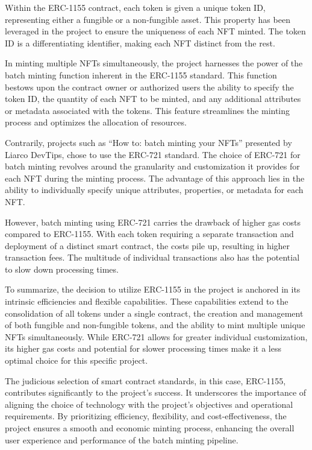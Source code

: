 \documentclass[10pt,twocolumn]{article}
\begin{document}
Within the ERC-1155 contract, each token is given a unique token ID, representing either a fungible or a non-fungible asset. This property has been leveraged in the project to ensure the uniqueness of each NFT minted. The token ID is a differentiating identifier, making each NFT distinct from the rest.

In minting multiple NFTs simultaneously, the project harnesses the power of the batch minting function inherent in the ERC-1155 standard. This function bestows upon the contract owner or authorized users the ability to specify the token ID, the quantity of each NFT to be minted, and any additional attributes or metadata associated with the tokens. This feature streamlines the minting process and optimizes the allocation of resources.\cite{erc115standered}

Contrarily, projects such as “How to: batch minting your NFTs” presented by Liarco DevTips, chose to use the ERC-721 standard. The choice of ERC-721 for batch minting revolves around the granularity and customization it provides for each NFT during the minting process. The advantage of this approach lies in the ability to individually specify unique attributes, properties, or metadata for each NFT.

However, batch minting using ERC-721 carries the drawback of higher gas costs compared to ERC-1155. With each token requiring a separate transaction and deployment of a distinct smart contract, the costs pile up, resulting in higher transaction fees. The multitude of individual transactions also has the potential to slow down processing times.\cite{ERC-721_stand}

To summarize, the decision to utilize ERC-1155 in the project is anchored in its intrinsic efficiencies and flexible capabilities. These capabilities extend to the consolidation of all tokens under a single contract, the creation and management of both fungible and non-fungible tokens, and the ability to mint multiple unique NFTs simultaneously. While ERC-721 allows for greater individual customization, its higher gas costs and potential for slower processing times make it a less optimal choice for this specific project.

The judicious selection of smart contract standards, in this case, ERC-1155, contributes significantly to the project's success. It underscores the importance of aligning the choice of technology with the project's objectives and operational requirements. By prioritizing efficiency, flexibility, and cost-effectiveness, the project ensures a smooth and economic minting process, enhancing the overall user experience and performance of the batch minting pipeline.
\end{document}
